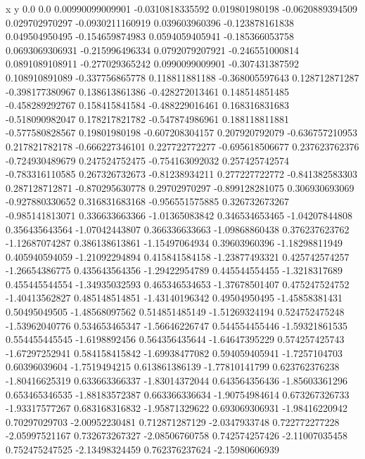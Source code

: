               x                y
            0.0              0.0
0.00990099009901  -0.0310818335592
 0.019801980198  -0.0620889394509
 0.029702970297  -0.0930211160919
 0.039603960396  -0.123878161838
 0.049504950495  -0.154659874983
0.0594059405941  -0.185366053758
0.0693069306931  -0.215996496334
0.0792079207921  -0.246551000814
0.0891089108911  -0.277029365242
0.0990099009901  -0.307431387592
 0.108910891089  -0.337756865778
 0.118811881188  -0.368005597643
 0.128712871287  -0.398177380967
 0.138613861386  -0.428272013461
 0.148514851485  -0.458289292767
 0.158415841584  -0.488229016461
 0.168316831683  -0.518090982047
 0.178217821782  -0.547874986961
 0.188118811881  -0.577580828567
  0.19801980198  -0.607208304157
 0.207920792079  -0.636757210953
 0.217821782178  -0.666227346101
 0.227722772277  -0.695618506677
 0.237623762376  -0.724930489679
 0.247524752475  -0.754163092032
 0.257425742574  -0.783316110585
 0.267326732673   -0.81238934211
 0.277227722772  -0.841382583303
 0.287128712871  -0.870295630778
  0.29702970297  -0.899128281075
 0.306930693069  -0.927880330652
 0.316831683168  -0.956551575885
 0.326732673267  -0.985141813071
 0.336633663366   -1.01365083842
 0.346534653465   -1.04207844808
 0.356435643564   -1.07042443807
 0.366336633663   -1.09868860438
 0.376237623762   -1.12687074287
 0.386138613861   -1.15497064934
  0.39603960396   -1.18298811949
 0.405940594059   -1.21092294894
 0.415841584158   -1.23877493321
 0.425742574257   -1.26654386775
 0.435643564356   -1.29422954789
 0.445544554455    -1.3218317689
 0.455445544554   -1.34935032593
 0.465346534653   -1.37678501407
 0.475247524752   -1.40413562827
 0.485148514851   -1.43140196342
  0.49504950495   -1.45858381431
  0.50495049505   -1.48568097562
 0.514851485149   -1.51269324194
 0.524752475248   -1.53962040776
 0.534653465347   -1.56646226747
 0.544554455446   -1.59321861535
 0.554455445545    -1.6198892456
 0.564356435644   -1.64647395229
 0.574257425743   -1.67297252941
 0.584158415842   -1.69938477082
 0.594059405941    -1.7257104703
  0.60396039604    -1.7519494215
 0.613861386139   -1.77810141799
 0.623762376238   -1.80416625319
 0.633663366337   -1.83014372044
 0.643564356436   -1.85603361296
 0.653465346535   -1.88183572387
 0.663366336634   -1.90754984614
 0.673267326733   -1.93317577267
 0.683168316832   -1.95871329622
 0.693069306931   -1.98416220942
  0.70297029703   -2.00952230481
 0.712871287129    -2.0347933748
 0.722772277228   -2.05997521167
 0.732673267327   -2.08506760758
 0.742574257426   -2.11007035458
 0.752475247525   -2.13498324459
 0.762376237624   -2.15980606939
